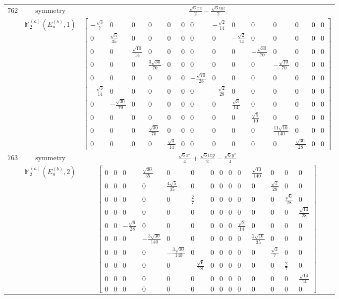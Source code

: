 \documentclass[fleqn,8pt,landscape]{jsarticle}
\begin{document}
\begin{longtable}{ccc}
$ 762 $ & $ \text{symmetry} $ & $ \frac{\sqrt{6} x z}{2} - \frac{\sqrt{6} i y z}{2} $ \\
$  $ & $ \mathbb{M}_{2}^{(a)}(E_{u}^{(b)},1) $ & $ \begin{bmatrix} - \frac{\sqrt{3}}{7} & 0 & 0 & 0 & 0 & 0 & 0 & - \frac{\sqrt{2}}{14} & 0 & 0 & 0 & 0 & 0 & 0 \\ 0 & \frac{\sqrt{5}}{35} & 0 & 0 & 0 & 0 & 0 & 0 & - \frac{\sqrt{2}}{14} & 0 & 0 & 0 & 0 & 0 \\ 0 & 0 & \frac{\sqrt{10}}{14} & 0 & 0 & 0 & 0 & 0 & 0 & - \frac{\sqrt{30}}{70} & 0 & 0 & 0 & 0 \\ 0 & 0 & 0 & \frac{3 \sqrt{30}}{70} & 0 & 0 & 0 & 0 & 0 & 0 & - \frac{\sqrt{10}}{70} & 0 & 0 & 0 \\ 0 & 0 & 0 & 0 & 0 & 0 & - \frac{\sqrt{70}}{28} & 0 & 0 & 0 & 0 & 0 & 0 & 0 \\ - \frac{\sqrt{3}}{14} & 0 & 0 & 0 & 0 & 0 & 0 & - \frac{\sqrt{2}}{28} & 0 & 0 & 0 & 0 & 0 & 0 \\ 0 & - \frac{\sqrt{30}}{70} & 0 & 0 & 0 & 0 & 0 & 0 & \frac{\sqrt{3}}{14} & 0 & 0 & 0 & 0 & 0 \\ 0 & 0 & 0 & 0 & 0 & 0 & 0 & 0 & 0 & \frac{\sqrt{5}}{10} & 0 & 0 & 0 & 0 \\ 0 & 0 & 0 & \frac{\sqrt{30}}{70} & 0 & 0 & 0 & 0 & 0 & 0 & \frac{11 \sqrt{10}}{140} & 0 & 0 & 0 \\ 0 & 0 & 0 & 0 & \frac{\sqrt{3}}{14} & 0 & 0 & 0 & 0 & 0 & 0 & \frac{\sqrt{30}}{28} & 0 & 0 \end{bmatrix} $ \\ \hline
$ 763 $ & $ \text{symmetry} $ & $ \frac{\sqrt{6} x^{2}}{4} + \frac{\sqrt{6} i x y}{2} - \frac{\sqrt{6} y^{2}}{4} $ \\
$  $ & $ \mathbb{M}_{2}^{(a)}(E_{u}^{(b)},2) $ & $ \begin{bmatrix} 0 & 0 & 0 & \frac{\sqrt{30}}{35} & 0 & 0 & 0 & 0 & 0 & 0 & \frac{\sqrt{10}}{140} & 0 & 0 & 0 \\ 0 & 0 & 0 & 0 & \frac{4 \sqrt{5}}{35} & 0 & 0 & 0 & 0 & 0 & 0 & \frac{\sqrt{2}}{28} & 0 & 0 \\ 0 & 0 & 0 & 0 & 0 & \frac{2}{7} & 0 & 0 & 0 & 0 & 0 & 0 & \frac{\sqrt{6}}{28} & 0 \\ 0 & 0 & 0 & 0 & 0 & 0 & 0 & 0 & 0 & 0 & 0 & 0 & 0 & \frac{\sqrt{14}}{28} \\ 0 & 0 & - \frac{\sqrt{6}}{28} & 0 & 0 & 0 & 0 & 0 & 0 & \frac{\sqrt{2}}{14} & 0 & 0 & 0 & 0 \\ 0 & 0 & 0 & - \frac{3 \sqrt{30}}{140} & 0 & 0 & 0 & 0 & 0 & 0 & \frac{2 \sqrt{10}}{35} & 0 & 0 & 0 \\ 0 & 0 & 0 & 0 & - \frac{3 \sqrt{30}}{140} & 0 & 0 & 0 & 0 & 0 & 0 & \frac{\sqrt{3}}{7} & 0 & 0 \\ 0 & 0 & 0 & 0 & 0 & - \frac{\sqrt{6}}{28} & 0 & 0 & 0 & 0 & 0 & 0 & \frac{2}{7} & 0 \\ 0 & 0 & 0 & 0 & 0 & 0 & 0 & 0 & 0 & 0 & 0 & 0 & 0 & \frac{\sqrt{14}}{14} \\ 0 & 0 & 0 & 0 & 0 & 0 & 0 & 0 & 0 & 0 & 0 & 0 & 0 & 0 \end{bmatrix} $ \\ \hline

\end{longtable}
\end{document}
